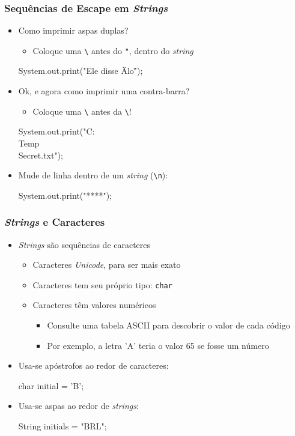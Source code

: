 \documentclass[xcolor={dvipsnames,table},aspectratio=169]{beamer}
\begin{document}
\begin{frame}[fragile]\frametitle{Sequências de Escape em \emph{Strings}}
\begin{itemize}
	\item Como imprimir aspas duplas?
	\begin{itemize}
		\item Coloque uma \texttt{\textbackslash} antes do \texttt{"}, dentro do \emph{string}
	\end{itemize}
\begin{javacode}
System.out.print("Ele disse \"Alo\"");
\end{javacode}
	\item Ok, e agora como imprimir uma contra-barra?
	\begin{itemize}
		\item Coloque uma \texttt{\textbackslash} antes da \texttt{\textbackslash}!
	\end{itemize}
\begin{javacode}
System.out.print("C:\\Temp\\Secret.txt");
\end{javacode}
	\item Mude de linha dentro de um \emph{string} (\texttt{\textbackslash}\texttt{n}):
\begin{javacode}
System.out.print("*\n**\n***\n");
\end{javacode}
\end{itemize}
\end{frame}

\begin{frame}[fragile]\frametitle{\emph{Strings} e Caracteres}
\begin{itemize}
	\item \emph{Strings} são sequências de caracteres
	\begin{itemize}
		\item Caracteres \emph{Unicode}, para ser mais exato
		\item Caracteres tem seu próprio tipo: \texttt{char}
		\item Caracteres têm valores numéricos
		\begin{itemize}
			\item Consulte uma tabela ASCII para descobrir o valor de cada código
			\item Por exemplo, a letra 'A' teria o valor 65 se fosse um número
		\end{itemize}
	\end{itemize}
	\item Usa-se apóstrofos ao redor de caracteres:
\begin{javacode}
char initial = 'B';
\end{javacode}
	\item Usa-se aspas ao redor de \emph{strings}:
\begin{javacode}
String initials = "BRL";
\end{javacode}
\end{itemize}
\end{frame}
\end{document}
